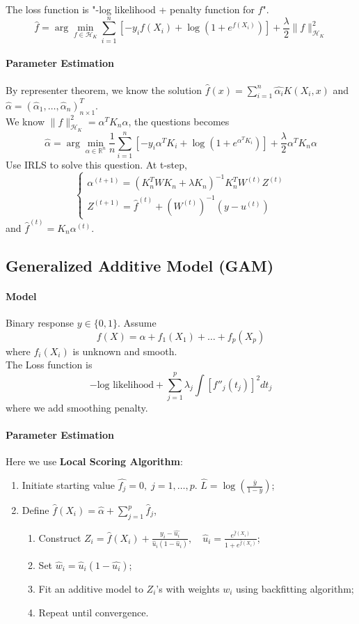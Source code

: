 \documentclass[12pt]{book}
\theoremstyle{definition}
\theoremstyle{remark}
\begin{document}
The loss function is "-log likelihood + penalty function for $f$". 
\[\hat{f} = \arg\underset{f\in\mathcal{H}_K}{\min}\sum_{i=1}^n[-y_if(X_i)+\log(1+e^{f(X_i)})]+\frac{\lambda}{2}\|f\|_{\mathcal{H}_K}^2\]
\paragraph{Parameter Estimation}
By representer theorem, we know the solution $\hat{f}(x) = \sum_{i=1}^n \hat{\alpha_i}K(X_i,x)$ and $\hat{\alpha} = (\hat{\alpha}_1, \dots, \hat{\alpha}_n)^T_{n\times 1}$.\\
We know $\|f\|_{\mathcal{H}_K}^2 = \alpha^T K_n\alpha$, the questions becomes
\[\hat{\alpha} = \arg\min_{\alpha\in\mathbb{R}^n}\frac1n\sum_{i=1}^n[-y_i\alpha^T K_i+\log(1+e^{\alpha^T K_i})]+\frac{\lambda}{2}\alpha^TK_n\alpha\]
Use IRLS to solve this question. At t-step, 
\[\begin{cases}
    \alpha^{(t+1)} = (K_n^TWK_n+\lambda K_n)^{-1}K_n^TW^{(t)}Z^{(t)}\\
    Z^{(t+1)} = \hat{f}^{(t)}+(W^{(t)})^{-1}(y-u^{(t)})
\end{cases}\]
and $\hat{f}^{(t)} = K_n\alpha^{(t)}$.


\subsection{Generalized Additive Model (GAM)}
\paragraph{Model}
Binary response $y \in \{0,1\}$. Assume \[f(X) = \alpha + f_1(X_1) + \dots + f_p(X_p)\]
where $f_i(X_i)$ is unknown and smooth. \\
The Loss function is 
\[-\text{log likelihood}+\sum_{j=1}^p\lambda_j\int[f''_j(t_j)]^2dt_j\]
where we add smoothing penalty.

\paragraph{Parameter Estimation}
Here we use \textbf{Local Scoring Algorithm}:
\begin{enumerate}
    \item Initiate starting value $\hat{f_j} = 0,\;j=1,\dots, p$. $\hat{L} = \log (\frac{\bar{y}}{1-\bar{y}})$;
    \item Define $\hat{f}(X_i) = \hat{\alpha}+\sum_{j=1}^p \hat{f}_j$,
    \begin{enumerate}
        \item Construct $Z_i = \hat{f}(X_i)+ \frac{y_i - \hat{u_i}}{\hat{u}_i(1-\hat{u}_i)},\quad \hat{u}_i = \frac{e^{\hat{f}(X_i)}}{1+e^{\hat{f}(X_i)}}$;
        \item Set $\hat{w}_i = \hat{u}_i(1-\hat{u_i})$;
        \item Fit an additive model to $Z_i$'s with weights $w_i$ using backfitting algorithm;
        \item Repeat until convergence.
    \end{enumerate}
\end{enumerate}
\end{document}
